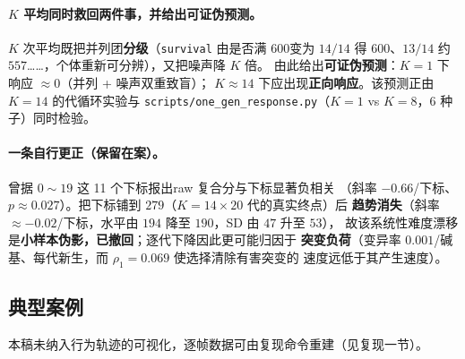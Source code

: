 \paragraph{$K$ 平均同时救回两件事，并给出可证伪预测。}
$K$ 次平均既把并列团\textbf{分级}（\texttt{survival} 由是否满 $600$变为
$14/14$ 得 $600$、$13/14$ 约 $557$……，个体重新可分辨），又把噪声降 $K$ 倍。
由此给出\textbf{可证伪预测}：$K=1$ 下响应 $\approx0$（并列 + 噪声双重致盲）；
$K\approx14$ 下应出现\textbf{正向响应}。该预测正由 $K=14$ 的代循环实验与
\texttt{scripts/one\_gen\_response.py}（$K=1$ vs $K=8$，6 种子）同时检验。

\paragraph{一条自行更正（保留在案）。}
曾据 $0\sim19$ 这 11 个下标报出raw 复合分与下标显著负相关
（斜率 $-0.66$/下标、$p\approx0.027$）。把下标铺到 $279$（$K=14\times20$ 代的真实终点）后
\textbf{趋势消失}（斜率 $\approx-0.02$/下标，水平由 $194$ 降至 $190$，SD 由 $47$ 升至 $53$），
故该系统性难度漂移是\textbf{小样本伪影，已撤回}；逐代下降因此更可能归因于
\textbf{突变负荷}（变异率 $0.001$/碱基、每代新生，而 $\rho_1=0.069$ 使选择清除有害突变的
速度远低于其产生速度）。

\subsection{典型案例}

本稿未纳入行为轨迹的可视化，逐帧数据可由复现命令重建（见复现一节）。

